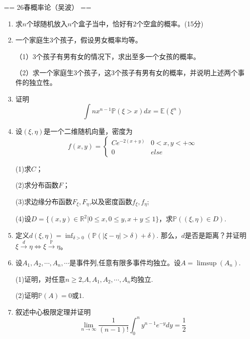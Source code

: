 

== 26春概率论（吴波） ==
\begin{enumerate}
    \item[一、]求$n$个球随机放入$n$个盒子当中，恰好有$2$个空盒的概率。(15分)
    \item[二、]一个家庭生3个孩子，假设男女概率均等。
        
        （1）3个孩子有男有女的情况下，求出至多一个女孩的概率。

        （2）求一个家庭生3个孩子，这3个孩子有男有女的概率，并说明上述两个事件的独立性。
    \item[三、]证明\[
        \int nx^{n-1} \mathbb{P}(\xi > x) dx =\mathbb{E} (\xi ^n)
    \]
    \item[四、]设$(\xi,\eta)$是一个二维随机向量，密度为
    \[f(x,y)=\begin{cases}
        Ce^{-2(x+y)} & 0<x,y<+\infty\\
        0 & else
    \end{cases}\]

    (1)求$C$；

    (2)求分布函数$F$；

    (3)求边缘分布函数$F_{\xi},F_{\eta}$,以及密度函数$f_{\xi},f_{\eta}$;

    (4)设$D=\{(x,y) \in \mathbb{R}^2 | 0 \le x,0 \le y,x+y \le 1\}$，求$\mathbb{P}((\xi,\eta) \in D)$.
    \item[五、] 定义$d(\xi,\eta)=\inf_{\delta > 0}(\mathbb{P} (|\xi-\eta|>\delta)+\delta)$.
    那么，$d$是否是距离？并证明$\xi \xrightarrow{d} \eta \Leftrightarrow \xi \xrightarrow{\mathbb{P}} \eta$。

    \item[六、]设$A_1,A_2,\cdots,A_n,\cdots$是事件列,任意有限多事件均独立。设$A=\limsup(A_n)$.

    (1)证明，对任意$n \ge 2$,$A,A_1,A_2,\cdots,A_n$均独立.

    (2)证明$\mathbb{P}(A)=0$或$1$.

    \item[七、]叙述中心极限定理并证明
    \[\lim_{n \to \infty}\dfrac{1}{(n-1)!} \int_0^n y^{n-1}e^{-y}dy=\frac{1}{2}\]



       
\end{enumerate}

